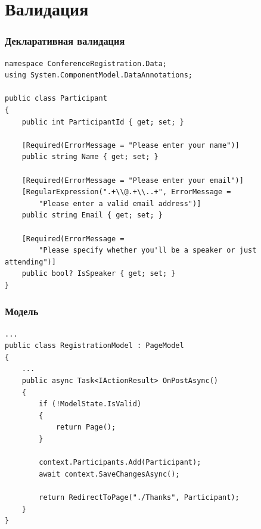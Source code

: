\documentclass{../../slides-style}
\begin{document}
    \section{Валидация}

    \begin{frame}[fragile]
        \frametitle{Декларативная валидация}
        \begin{footnotesize}
            \begin{verbatim}
namespace ConferenceRegistration.Data;
using System.ComponentModel.DataAnnotations;

public class Participant
{
    public int ParticipantId { get; set; }

    [Required(ErrorMessage = "Please enter your name")]
    public string Name { get; set; }

    [Required(ErrorMessage = "Please enter your email")]
    [RegularExpression(".+\\@.+\\..+", ErrorMessage = 
        "Please enter a valid email address")]
    public string Email { get; set; }

    [Required(ErrorMessage = 
        "Please specify whether you'll be a speaker or just attending")]
    public bool? IsSpeaker { get; set; }
}
            \end{verbatim}
        \end{footnotesize}
    \end{frame}

    \begin{frame}[fragile]
        \frametitle{Модель}
        \begin{footnotesize}
            \begin{verbatim}
...
public class RegistrationModel : PageModel
{
    ...
    public async Task<IActionResult> OnPostAsync()
    {
        if (!ModelState.IsValid)
        {
            return Page();
        }

        context.Participants.Add(Participant);
        await context.SaveChangesAsync();

        return RedirectToPage("./Thanks", Participant);
    }
}
            \end{verbatim}
        \end{footnotesize}
    \end{frame}
\end{document}
